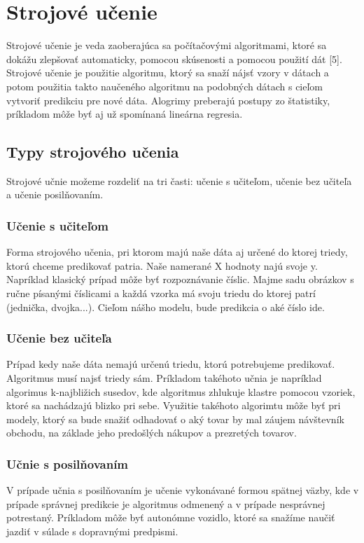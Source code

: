 
\chapter{Strojové učenie}
Strojové učenie je veda zaoberajúca sa počítačovými algoritmami, ktoré sa dokážu zlepšovať automaticky, pomocou skúsenosti a pomocou použití dát [5]. Strojové učenie je použitie algoritmu, ktorý sa snaží nájsť vzory v dátach a potom použitia takto naučeného algoritmu na podobných dátach s cieľom vytvoriť predikciu pre nové dáta. Alogrimy preberajú postupy zo štatistiky, príkladom môže byť aj už spomínaná lineárna regresia. 

\section{Typy strojového učenia}
Strojové učnie možeme rozdeliť na tri časti: učenie s učiteľom, učenie bez učiteľa a učenie posilňovaním.

\subsection{Učenie s učiteľom}
Forma strojového učenia, pri ktorom majú naše dáta aj určené do ktorej triedy, ktorú chceme predikovať patria. Naše namerané X hodnoty najú svoje y. Napríklad klasický prípad môže byť rozpoznávanie číslic. Majme sadu obrázkov s ručne písanými číslicami a každá vzorka má svoju triedu do ktorej patrí (jednička, dvojka...). Cieľom nášho modelu, bude predikcia o aké číslo ide.

\subsection{Učenie bez učiteľa}
Prípad kedy naše dáta nemajú určenú triedu, ktorú potrebujeme predikovať. Algoritmus musí najsť triedy sám. Príkladom takéhoto učnia je napríklad algorimus k-najbližich susedov, kde algoritmus zhlukuje klastre pomocou vzoriek, ktoré sa nachádzajú blizko pri sebe. Využitie takéhoto algorimtu môže byť pri modely, ktorý sa bude snažiť odhadovať o aký tovar by mal záujem návštevník obchodu, na základe jeho predošlých nákupov a prezretých tovarov.

\subsection{Učnie s posilňovaním}
V prípade učnia s posilňovaním je učenie vykonávané formou spätnej väzby, kde v prípade správnej predikcie je algoritmus odmenený a v prípade nesprávnej potrestaný. Príkladom môže byť autonómne vozidlo, ktoré sa snažíme naučiť jazdiť v súlade s dopravnými predpismi.

